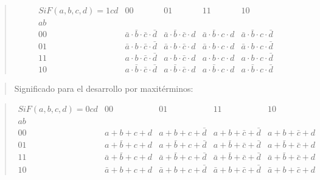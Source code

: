 \documentclass[
]{article}
\begin{document}
\begin{quote}
\[\begin{matrix}
{\mathit{Si}F{{({a,b,c,d})} = 1}\mathit{cd}} & 00 & 01 & 11 & 10 \\
\mathit{ab} & & & & \\
00 & {{{\bar{a} \cdot \bar{b}} \cdot \bar{c}} \cdot \bar{d}} & {{{\bar{a} \cdot \bar{b}} \cdot \bar{c}} \cdot d} & {{{\bar{a} \cdot \bar{b}} \cdot c} \cdot d} & {{{\bar{a} \cdot \bar{b}} \cdot c} \cdot \bar{d}} \\
01 & {{{\bar{a} \cdot b} \cdot \bar{c}} \cdot \bar{d}} & {{{\bar{a} \cdot b} \cdot \bar{c}} \cdot d} & {{{\bar{a} \cdot b} \cdot c} \cdot d} & {{{\bar{a} \cdot b} \cdot c} \cdot \bar{d}} \\
11 & {{{a \cdot b} \cdot \bar{c}} \cdot \bar{d}} & {{{a \cdot b} \cdot \bar{c}} \cdot d} & {{{a \cdot b} \cdot c} \cdot d} & {{{a \cdot b} \cdot c} \cdot \bar{d}} \\
10 & {{{a \cdot \bar{b}} \cdot \bar{c}} \cdot \bar{d}} & {{{a \cdot \bar{b}} \cdot \bar{c}} \cdot d} & {{{a \cdot \bar{b}} \cdot c} \cdot d} & {{{a \cdot \bar{b}} \cdot c} \cdot \bar{d}}
\end{matrix}\]
\end{quote}

\begin{quote}
Significado para el desarrollo por maxitérminos:
\end{quote}

\begin{quote}
\[\begin{matrix}
{\mathit{Si}F{{({a,b,c,d})} = 0}\mathit{cd}} & 00 & 01 & 11 & 10 \\
\mathit{ab} & & & & \\
00 & {{{a + b} + c} + d} & {{{a + b} + c} + \bar{d}} & {{{a + b} + \bar{c}} + \bar{d}} & {{{a + b} + \bar{c}} + d} \\
01 & {{{a + \bar{b}} + c} + d} & {{{a + \bar{b}} + c} + \bar{d}} & {{{a + \bar{b}} + \bar{c}} + \bar{d}} & {{{a + \bar{b}} + \bar{c}} + d} \\
11 & {{{\bar{a} + \bar{b}} + c} + d} & {{{\bar{a} + \bar{b}} + c} + \bar{d}} & {{{\bar{a} + \bar{b}} + \bar{c}} + \bar{d}} & {{{\bar{a} + \bar{b}} + \bar{c}} + d} \\
10 & {{{\bar{a} + b} + c} + d} & {{{\bar{a} + b} + c} + \bar{d}} & {{{\bar{a} + b} + \bar{c}} + \bar{d}} & {{{\bar{a} + b} + \bar{c}} + d}
\end{matrix}\]
\end{quote}
\end{document}
